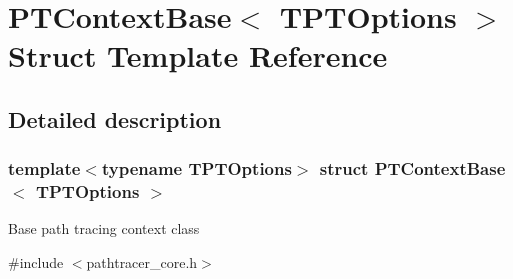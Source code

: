 \hypertarget{struct_p_t_context_base}{}\section{P\+T\+Context\+Base$<$ T\+P\+T\+Options $>$ Struct Template Reference}
\label{struct_p_t_context_base}


\subsection{Detailed description}
\subsubsection*{template$<$typename T\+P\+T\+Options$>$\newline
struct P\+T\+Context\+Base$<$ T\+P\+T\+Options $>$}

Base path tracing context class 

{\ttfamily \#include $<$pathtracer\+\_\+core.\+h$>$}

